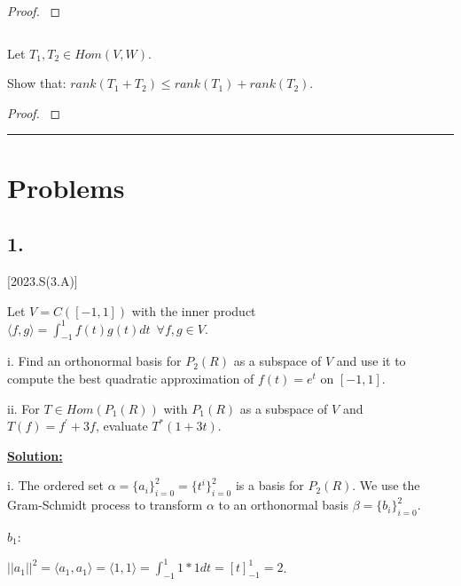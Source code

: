 \documentclass{article}
\newenvironment{customthm}[1]
  {\renewcommand\theinnercustomthm{#1}\innercustomthm}
  {\endinnercustomthm}
\begin{document}
\begin{proof}
  $ $

  


\end{proof}
\newpage


\begin{customthm}{22}[2012.F(1.D)]
  $ $

  Let $T_1, T_2 \in Hom(V,W)$.

  Show that: $rank(T_1 + T_2) \leq rank(T_1) + rank(T_2)$.
\end{customthm}

\begin{proof}
  $ $

  


\end{proof}
\newpage


% 

\noindent\rule{\textwidth}{1pt}

\section*{Problems}

\subsection*{1.}[2023.S(3.A)]

Let $V = C([-1, 1])$ with the inner product $\langle f,g \rangle = \int_{-1}^{1} f(t)g(t)dt \enspace \forall f,g \in V$.

i. Find an orthonormal basis for $P_2(R)$ as a subspace of $V$ and use it to compute the best quadratic approximation of $f(t) = e^t$ on $[-1, 1]$.

ii. For $T \in Hom(P_1(R))$ with $P_1(R)$ as a subspace of $V$ and $T(f) = f^\prime + 3f$, evaluate $T^*(1 + 3t)$.
\newline

\begin{center}
  \textbf{\underline{Solution:}}  
\end{center}

i. The ordered set $\alpha = \{a_i \}_{i = 0}^{2} = \{t^i\}_{i = 0}^{2}$ is a basis for $P_2(R)$.
We use the Gram-Schmidt process to transform $\alpha$ to an orthonormal basis $\beta= \{b_i \}_{i = 0}^{2}$.
\newline

\underline{$b_1$}:

$||a_1||^2 
= \langle a_1, a_1 \rangle 
= \langle 1, 1 \rangle
= \int_{-1}^{1} 1*1 dt 
= [t]_{-1}^{1} = 2$.
\newline
\end{document}
